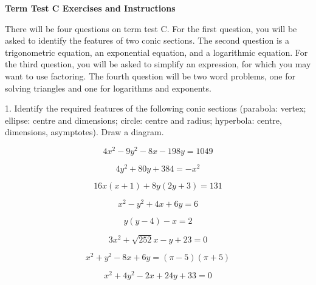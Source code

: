 \documentclass[11pt]{article}
\begin{document}
\textbf{Term Test C Exercises and Instructions}

There will be four questions on term test C. For the first question,
you will be asked to identify the features of two conic sections. The
second question is a trigonometric equation, an exponential equation,
and a logarithmic equation. For the third question, you will be asked
to simplify an expression, for which you may want to use factoring.
The fourth question will be two word problems, one for solving
triangles and one for logarithms and exponents.

1. Identify the required features of the following conic sections
(parabola: vertex; ellipse: centre and dimensions; circle: centre and
radius; hyperbola: centre, dimensions, asymptotes). Draw a diagram.

\begin{equation}
  \label{eq:ohdiedoe}
4x^{2}-9y^{2}-8x-198y=1049
\end{equation}

\begin{equation}
  \label{eq:mahbeizo}
4y^{2}+80y+384=-x^{2}
\end{equation}

\begin{equation}
  \label{eq:ohwoojie}
16x(x+1)+8y(2y+3)=131
\end{equation}

\begin{equation}
  \label{eq:chohtohk}
x^{2}-y^{2}+4x+6y=6
\end{equation}

\begin{equation}
  \label{eq:gofushoo}
y(y-4)-x=2
\end{equation}

\begin{equation}
  \label{eq:vibeibie}
3x^{2}+\sqrt{252}x-y+23=0
\end{equation}

\begin{equation}
  \label{eq:aepheipi}
x^{2}+y^{2}-8x+6y=(\pi-5)(\pi+5)
\end{equation}

\begin{equation}
  \label{eq:vogeobab}
x^{2}+4y^{2}-2x+24y+33=0
\end{equation}
\end{document}
